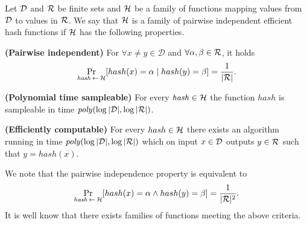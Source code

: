\begin{definition}
Let $\mathcal{D}$ and $\mathcal{R}$ be finite sets and $\mathcal{H}$ be a family of functions mapping values from $\mathcal{D}$ to values in $\mathcal{R}$.
We say that $\mathcal{H}$ is a \textnormal{family of pairwise independent efficient hash functions}
if $\mathcal{H}$ has the following properties.

\textbf{(Pairwise independent)} For $\forall x \neq y \in \mathcal{D}$ and $\forall \alpha, \beta \in \mathcal{R}$, it holds
\begin{displaymath}
\underset{\hash \la0 \cH}{\Pr}[hash(x) = \alpha \mid hash(y) = \beta] = \frac{1}{|\cR|}.
\end{displaymath}

\textbf{(Polynomial time sampleable)} For every $\mathit{hash} \in \mathcal{H}$ the function $\mathit{hash}$ is sampleable in time $\mathit{poly}(\log|\mathcal{D}|, \log|\mathcal{R}|)$.

\textbf{(Efficiently computable)}
For every $hash \in \mathcal{H}$ there exists an algorithm running in time $\mathit{poly}(\log|\mathcal{D}|, \log|\mathcal{R}|)$ which
on input $x \in \mathcal{D}$ outputs $y \in \mathcal{R}$ such that $y = hash(x)$.
\end{definition}

We note that the pairwise independence property is equivalent to
\begin{displaymath}
\underset{\hash \la0 \cH}{\Pr}[hash(x) = \alpha \land hash(y) = \beta] = \frac{1}{|\cR|^2}.
\end{displaymath}
It is well know \cite{Carter:1977:UCH:800105.803400} that there exists families of functions meeting the above criteria.


